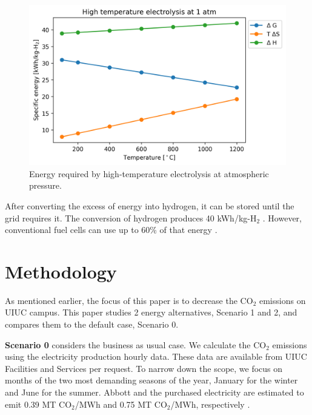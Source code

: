 \documentclass{anstrans}
\begin{document}
\begin{figure}[htbp!] %
    \centering
    \includegraphics[width=0.90\linewidth]{figures/hte-energy}
    \hfill
    \caption{Energy required by high-temperature electrolysis at atmospheric pressure.}
    \label{fig:hte-energy}
\end{figure}

After converting the excess of energy into hydrogen, it can be stored until the grid requires it.
The conversion of hydrogen produces 40 kWh/kg-H$_2$ \cite{ursua_hydrogen_2012}.
However, conventional fuel cells can use up to 60\% of that energy \cite{doe_energy_fuel_2015}.



\section{Methodology}

As mentioned earlier, the focus of this paper is to decrease the CO$_2$ emissions on UIUC campus.
This paper studies 2 energy alternatives, Scenario 1 and 2, and compares them to the default case, Scenario 0.

\textbf{Scenario 0} considers the business as usual case.
We calculate the CO$_2$ emissions using the electricity production hourly data.
These data are available from UIUC Facilities and Services per request.
To narrow down the scope, we focus on months of the two most demanding seasons of the year, January for the winter and June for the summer.
Abbott and the purchased electricity are estimated to emit 0.39 MT CO$_2$/MWh and 0.75 MT CO$_2$/MWh, respectively \cite{isee_illinois_2015, isee_illinois_2020}.
\end{document}
